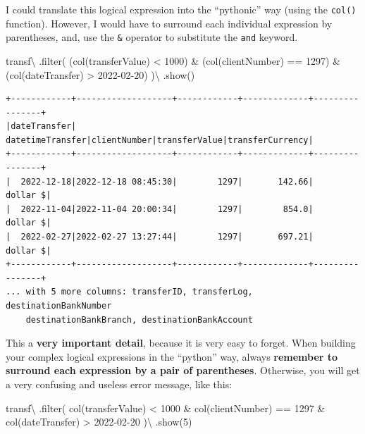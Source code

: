 \documentclass[
  11pt,
  letterpaper,
  DIV=11,
  numbers=noendperiod]{scrreprt}
\newenvironment{Shaded}{\begin{snugshade}}{\end{snugshade}}
\newcommand{\BuiltInTok}[1]{\textcolor[rgb]{0.00,0.23,0.31}{#1}}
\newcommand{\DecValTok}[1]{\textcolor[rgb]{0.68,0.00,0.00}{#1}}
\newcommand{\NormalTok}[1]{\textcolor[rgb]{0.00,0.23,0.31}{#1}}
\newcommand{\OperatorTok}[1]{\textcolor[rgb]{0.37,0.37,0.37}{#1}}
\newcommand{\StringTok}[1]{\textcolor[rgb]{0.13,0.47,0.30}{#1}}
\begin{document}
I could translate this logical expression into the ``pythonic'' way
(using the \texttt{col()} function). However, I would have to surround
each individual expression by parentheses, and, use the \texttt{\&}
operator to substitute the \texttt{and} keyword.

\begin{Shaded}
\begin{Highlighting}[]
\NormalTok{transf}\OperatorTok{\textbackslash{}}
\NormalTok{  .}\BuiltInTok{filter}\NormalTok{(}
\NormalTok{    (col(}\StringTok{\textquotesingle{}transferValue\textquotesingle{}}\NormalTok{) }\OperatorTok{\textless{}} \DecValTok{1000}\NormalTok{) }\OperatorTok{\&}
\NormalTok{    (col(}\StringTok{\textquotesingle{}clientNumber\textquotesingle{}}\NormalTok{) }\OperatorTok{==} \DecValTok{1297}\NormalTok{) }\OperatorTok{\&}
\NormalTok{    (col(}\StringTok{\textquotesingle{}dateTransfer\textquotesingle{}}\NormalTok{) }\OperatorTok{\textgreater{}} \StringTok{\textquotesingle{}2022{-}02{-}20\textquotesingle{}}\NormalTok{)}
\NormalTok{  )}\OperatorTok{\textbackslash{}}
\NormalTok{  .show()}
\end{Highlighting}
\end{Shaded}

\begin{verbatim}
+------------+-------------------+------------+-------------+----------------+
|dateTransfer|   datetimeTransfer|clientNumber|transferValue|transferCurrency|
+------------+-------------------+------------+-------------+----------------+
|  2022-12-18|2022-12-18 08:45:30|        1297|       142.66|        dollar $|
|  2022-11-04|2022-11-04 20:00:34|        1297|        854.0|        dollar $|
|  2022-02-27|2022-02-27 13:27:44|        1297|       697.21|        dollar $|
+------------+-------------------+------------+-------------+----------------+
... with 5 more columns: transferID, transferLog, destinationBankNumber
    destinationBankBranch, destinationBankAccount
\end{verbatim}

This a \textbf{very important detail}, because it is very easy to
forget. When building your complex logical expressions in the ``python''
way, always \textbf{remember to surround each expression by a pair of
parentheses}. Otherwise, you will get a very confusing and useless error
message, like this:

\begin{Shaded}
\begin{Highlighting}[]
\NormalTok{transf}\OperatorTok{\textbackslash{}}
\NormalTok{  .}\BuiltInTok{filter}\NormalTok{(}
\NormalTok{    col(}\StringTok{\textquotesingle{}transferValue\textquotesingle{}}\NormalTok{) }\OperatorTok{\textless{}} \DecValTok{1000} \OperatorTok{\&}
\NormalTok{    col(}\StringTok{\textquotesingle{}clientNumber\textquotesingle{}}\NormalTok{) }\OperatorTok{==} \DecValTok{1297} \OperatorTok{\&}
\NormalTok{    col(}\StringTok{\textquotesingle{}dateTransfer\textquotesingle{}}\NormalTok{) }\OperatorTok{\textgreater{}} \StringTok{\textquotesingle{}2022{-}02{-}20\textquotesingle{}}
\NormalTok{  )}\OperatorTok{\textbackslash{}}
\NormalTok{  .show(}\DecValTok{5}\NormalTok{)}
\end{Highlighting}
\end{Shaded}
\end{document}
